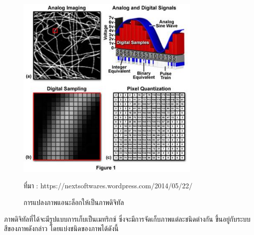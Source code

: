 		\begin{figure}[H]
			\centering
			\includegraphics[width=0.8\textwidth]{Figures/2/1.jpg}
			\caption{การแปลงภาพแอนะล็อกให้เป็นภาพดิจิทัล}{ที่มา : https://nextsoftwares.wordpress.com/2014/05/22/}
			\label{Fig:Studentloan1}
		\end{figure}
		ภาพดิจิทัลที่ได้จะมีรูปแบบการเก็บเป็นเมทริกซ์ ซึ่งจะมีการจัดเก็บภาพแต่ละชนิดต่างกัน ขึ้นอยู่กับระบบสีของภาพดังกล่าว โดยแบ่งชนิดของภาพได้ดังนี้
